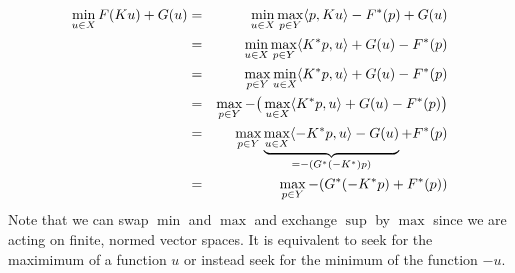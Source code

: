         \begin{eqnarray}
            \min_{u \in X} F(Ku) + G(u) &=& \min_{u \in X} \max_{p \in Y} \langle p, Ku \rangle - F^{\ast}(p) + G(u) \notag \\
            &=& \min_{u \in X} \max_{p \in Y} \langle K^{\ast}p, u \rangle + G(u) - F^{\ast}(p) \notag \\
            &=& \max_{p \in Y} \min_{u \in X} \langle K^{\ast}p, u \rangle + G(u) - F^{\ast}(p) \notag \\
            &=& \max_{p \in Y} -\big(\max_{u \in X} \langle K^{\ast}p, u \rangle + G(u) - F^{\ast}(p)\big) \notag \\
            &=& \max_{p \in Y} \underbrace{\max_{u \in X} \langle -K^{\ast}p, u \rangle - G(u)}_{= -(G^{\ast}(-K^{\ast})p)} + F^{\ast}(p) \notag \\
            &=& \max_{p \in Y} -(G^{\ast}(-K^{\ast}p) + F^{\ast}(p))
            \label{eq:swap_min_to_max}
        \end{eqnarray}
    Note that we can swap $\min$ and $\max$ and exchange $\sup$ by $\max$ since we are acting on finite, normed vector spaces. It is equivalent to seek for the maximimum of a function $u$ or instead seek for the minimum of the function $-u$.



